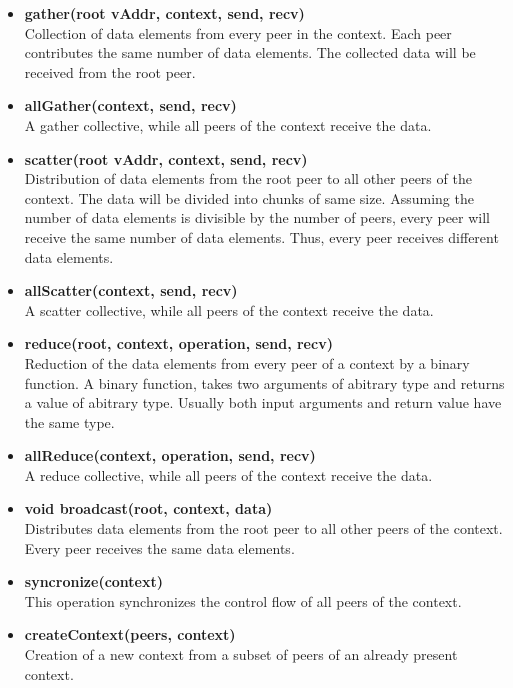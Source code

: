 \begin{itemize}
\item  \textbf{gather(root vAddr, context, send, recv)}\\
  Collection of data elements from every peer in the context. Each peer
  contributes the same number of data elements. The collected data will
  be received from the root peer.

\item \textbf{allGather(context, send, recv)}\\
  A gather collective, while all peers of the context receive the data.

\item  \textbf{scatter(root vAddr, context, send, recv)}\\
  Distribution of data elements from the root peer to all other peers of
  the context. The data will be divided into chunks of same
  size. Assuming the number of data elements is divisible by the number
  of peers, every peer will receive the same number of data
  elements. Thus, every peer receives different data elements.

\item  \textbf{allScatter(context, send, recv)}\\
  A scatter collective, while all peers of the context receive the data.

\item  \textbf{reduce(root, context, operation, send, recv)}\\
  Reduction of the data elements from every peer of a context by a
  binary function. A binary function, takes two arguments of abitrary
  type and returns a value of abitrary type. Usually both input
  arguments and return value have the same type.

\item  \textbf{allReduce(context, operation, send, recv)}\\
  A reduce collective, while all peers of the context receive the
  data.

\item  \textbf{void broadcast(root, context, data)}\\
  Distributes data elements from the root peer to all other peers of
  the context. Every peer receives the same data elements.

\item  \textbf{syncronize(context)}\\
  This operation synchronizes the control flow of all peers of the
  context.

\item  \textbf{createContext(peers, context)}\\ 
  Creation of a new context from a subset of peers of an already
  present context.

\end{itemize}

